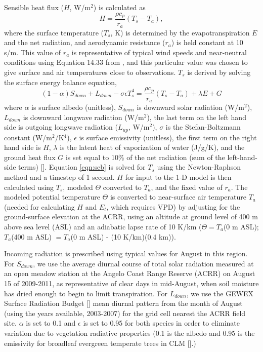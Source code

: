 Sensible heat flux ($H$, W/m$^2$) is calculated as
\begin{equation}
H = \frac{\rho c_p}{r_a} (T_s - T_a),
\end{equation} 
where the surface temperature ($T_s$, K) is determined by the evapotranspiration $E$ and the net radiation, and aerodynamic resistance ($r_a$) is held constant at 10 s/m.  This value of $r_a$ is representative of typical wind speeds and near-neutral conditions using Equation 14.33 from \cite{bonan}, and this particular value was chosen to give surface and air temperatures close to observations.  $T_s$ is derived by solving the surface energy balance equation,
\begin{equation}
(1-\alpha) S_{down} + L_{down} - \sigma \epsilon T_s^4 = \frac{\rho c_p}{r_a} (T_s - T_a) + \lambda E + G
\label{eqn:seb}
\end{equation}
where $\alpha$ is surface albedo (unitless), $S_{down}$ is downward solar radiation (W/m$^2$), $L_{down}$ is downward longwave radiation (W/m$^2$), the last term on the left hand side is outgoing longwave radiation ($L_{up}$, W/m$^2$), $\sigma$ is the Stefan-Boltzmann constant (W/m$^2$/K$^4$), $\epsilon$ is surface emissivity (unitless), the first term on the right hand side is $H$, $\lambda$ is the latent heat of vaporization of water (J/g/K), and the ground heat flux $G$ is set equal to 10\% of the net radiation (sum of the left-hand-side terms) [\cite{ogee2001long}].  Equation \ref{eqn:seb} is solved for $T_s$ using the Newton-Raphson method and a timestep of 1 second.  $H$ for input to the 1-D model is then calculated using $T_s$, modeled $\Theta$ converted to $T_a$, and the fixed value of $r_a$.  The modeled potential temperature $\Theta$ is converted to near-surface air temperature $T_a$ (needed for calculating $H$ and $E_t$, which requires VPD) by adjusting for the ground-surface elevation at the ACRR, using an altitude at ground level of 400 m above sea level (ASL) and an adiabatic lapse rate of 10 K/km ($\Theta = T_a$(0 m ASL); $T_a$(400 m ASL) $= T_a$(0 m ASL) - (10 K/km)(0.4 km)).

Incoming radiation is prescribed using typical values for August in this region.  For $S_{down}$, we use the average diurnal course of total solar radiation measured at an open meadow station at the Angelo Coast Range Reserve (ACRR) on August 15 of 2009-2011, as representative of clear days in mid-August, when soil moisture has dried enough to begin to limit transpiration.  For $L_{down}$, we use the GEWEX Surface Radiation Budget [\cite{stackhouse2011nasa}] mean diurnal pattern from the month of August (using the years available, 2003-2007) for the grid cell nearest the ACRR field site.  $\alpha$ is set to 0.1 and $\epsilon$ is set to 0.95 for both species in order to eliminate variation due to vegetation radiative properties (0.1 is the albedo and 0.95 is the emissivity for broadleaf evergreen temperate trees in CLM [\cite{oleson2010technical}].)


